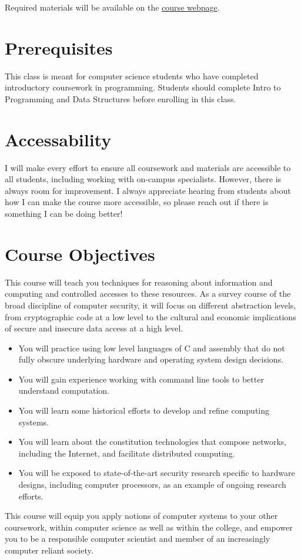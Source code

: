 \documentclass[11pt]{article}
\begin{document}
Required materials will be available on the \href{https://cd-public.github.io/courses/sysl}{course webpage}.



\section*{Prerequisites}

This class is meant for computer science students who have completed introductory coursework in programming.  Students should complete Intro to Programming and Data Structures before enrolling in this class.

\section*{Accessability}

I will make every effort to ensure all coursework and materials are accessible to all students, including working with on-campus specialists. However, there is always room for improvement. I always appreciate hearing from students about how I can make the course more accessible, so please reach out if there is something I can be doing better!


\section*{Course Objectives}
This course will teach you techniques for reasoning about information and computing and controlled accesses to these resources. As a survey course of the broad discipline of computer security, it will focus on different abstraction levels, from cryptographic code at a low level to the cultural and economic implications of secure and insecure data access at a high level.
\begin{itemize}
\item You will practice using low level languages of C and assembly that do not fully obscure underlying hardware and operating system design decisions.
\item You will gain experience working with command line tools to better understand computation.
\item You will learn some historical efforts to develop and refine computing systems.
\item You will learn about the constitution technologies that compose networks, including the Internet, and facilitate distributed computing.
\item You will be exposed to state-of-the-art security research specific to hardware designs, including computer processors, as an example of ongoing research efforts.
\end{itemize}
This course will equip you apply notions of computer systems to your other coursework, within computer science as well as within the college, and empower you to be a responsible computer scientist and member of an increasingly computer reliant society.
\end{document}
